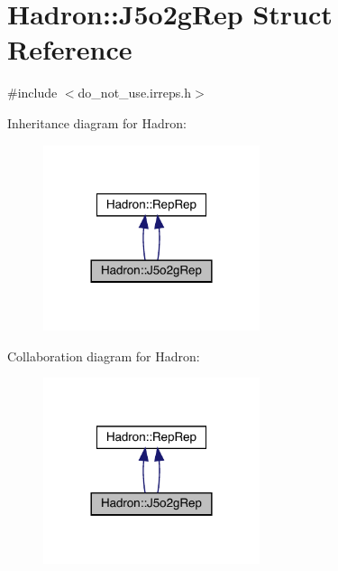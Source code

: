 \hypertarget{structHadron_1_1J5o2gRep}{}\section{Hadron\+:\+:J5o2g\+Rep Struct Reference}
\label{structHadron_1_1J5o2gRep}


{\ttfamily \#include $<$do\+\_\+not\+\_\+use.\+irreps.\+h$>$}



Inheritance diagram for Hadron\+:
\nopagebreak
\begin{figure}[H]
\begin{center}
\leavevmode
\includegraphics[width=180pt]{d3/d61/structHadron_1_1J5o2gRep__inherit__graph}
\end{center}
\end{figure}


Collaboration diagram for Hadron\+:
\nopagebreak
\begin{figure}[H]
\begin{center}
\leavevmode
\includegraphics[width=180pt]{d2/d52/structHadron_1_1J5o2gRep__coll__graph}
\end{center}
\end{figure}

